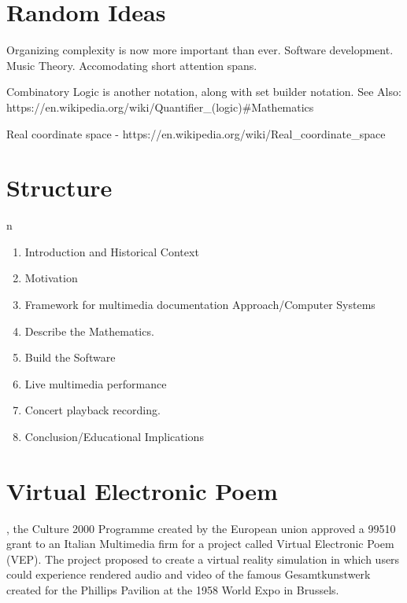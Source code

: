 
\section{Random Ideas}
\label{sec:random-ideas}

Organizing complexity is now more important than ever. Software
development. Music Theory. Accomodating short attention spans.

Combinatory Logic is another notation, along with set builder
notation. See Also:
https://en.wikipedia.org/wiki/Quantifier_(logic)#Mathematics

Real coordinate space  - https://en.wikipedia.org/wiki/Real_coordinate_space


\section{Structure}
\label{sec:structure}

n
\begin{enumerate}
\item Introduction and  Historical Context %
\item Motivation
\item Framework for multimedia documentation Approach/Computer Systems
\item Describe the Mathematics. %
\item Build the Software
\item Live multimedia performance
\item Concert playback recording. 
\item Conclusion/Educational Implications
\end{enumerate}


\section{Virtual Electronic Poem}
\label{sec:vep}

, the Culture 2000 Programme created by the 
European union approved a 99510\EUR{} grant to an Italian Multimedia 
firm for a project called Virtual Electronic Poem (VEP)\cite{eu2004}. 
The project proposed to create a virtual reality simulation in which 
users could experience rendered audio and video of the famous
Gesamtkunstwerk created for the Phillips Pavilion at the 1958 World
Expo in Brussels. 

